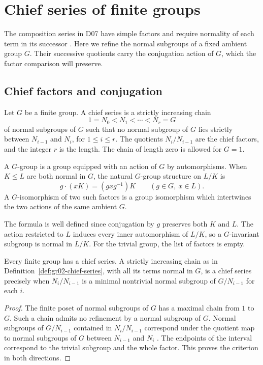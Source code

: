 \chapter{Chief series of finite groups}
\label{ch:gr02-chief}

The composition series in D07 have simple factors and require
normality of each term in its successor
\cite[entries K07.06.composition\_series\_definition and
K07.06.jordan\_holder\_extension]{d07}. Here we refine the normal
subgroups of a fixed ambient group \(G\). Their successive quotients
carry the conjugation action of \(G\), which the factor comparison
will preserve.

\section{Chief factors and conjugation}

\begin{definition}
\label{def:gr02-chief-series}
Let \(G\) be a finite group. A chief series is a strictly increasing
chain
\[
  1=N_0<N_1<\cdots<N_r=G
\]
of normal subgroups of \(G\) such that no normal subgroup of \(G\)
lies strictly between \(N_{i-1}\) and \(N_i\), for \(1\le i\le r\).
The quotients \(N_i/N_{i-1}\) are the chief factors, and the integer
\(r\) is the length. The chain of length zero is allowed for \(G=1\).

A \(G\)-group is a group equipped with an action of \(G\) by
automorphisms. When \(K\le L\) are both normal in \(G\), the
natural \(G\)-group structure on \(L/K\) is
\[
  g\cdot(xK)=(gxg^{-1})K \qquad (g\in G,\ x\in L).
\]
A \(G\)-isomorphism of two such factors is a group isomorphism
which intertwines the two actions of the same ambient \(G\).
\end{definition}

The formula is well defined since conjugation by \(g\) preserves both
\(K\) and \(L\). The action restricted to \(L\) induces every inner
automorphism of \(L/K\), so a \(G\)-invariant subgroup is normal in
\(L/K\). For the trivial group, the list of factors is empty.

\begin{proposition}
\label{prop:gr02-chief-existence}
Every finite group has a chief series. A strictly increasing chain as
in Definition~\ref{def:gr02-chief-series}, with all its terms normal in
\(G\), is a chief series precisely when \(N_i/N_{i-1}\) is a minimal
nontrivial normal subgroup of \(G/N_{i-1}\) for each \(i\).
\end{proposition}
\begin{proof}
The finite poset of normal subgroups of \(G\) has a maximal chain
from \(1\) to \(G\). Such a chain admits no refinement by a normal
subgroup of \(G\). Normal subgroups of \(G/N_{i-1}\) contained in
\(N_i/N_{i-1}\) correspond under the quotient map to normal
subgroups of \(G\) between \(N_{i-1}\) and \(N_i\)
\cite[entry K07.04.correspondence\_theorem]{d07}. The endpoints of
the interval correspond to the trivial subgroup and the whole
factor. This proves the criterion in both directions.
\end{proof}

